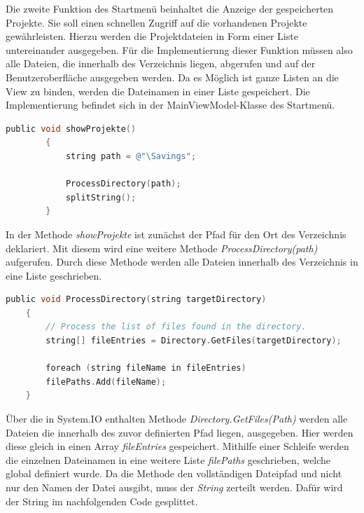 \linebreak
Die zweite Funktion des Startmenü beinhaltet die Anzeige der gespeicherten Projekte. Sie soll einen schnellen Zugriff auf die 
vorhandenen Projekte gewährleisten. Hierzu werden die Projektdateien in Form einer Liste untereinander ausgegeben. Für die 
Implementierung dieser Funktion müssen also alle Dateien, die innerhalb des Verzeichnis liegen, abgerufen und auf der 
Benutzeroberfläche ausgegeben werden. Da es Möglich ist ganze Listen an die View zu binden, werden die Dateinamen in einer Liste 
gespeichert. Die Implementierung befindet sich in der MainViewModel-Klasse des Startmenü. 
\\
\begin{lstlisting}[language=C,
    frame=single,           % Ein Rahmen um den Code
    framexleftmargin=15pt,  % Rahmen link von den Zahlen
    style=algoBericht,
    label={showProjekte},
    captionpos=b,           % Caption unter den Code setzen
    caption={showProjekte}]
        public void showProjekte()
        {
            string path = @"\Savings";
            
            ProcessDirectory(path);
            splitString();
        }
\end{lstlisting}
In der Methode \textit{showProjekte} ist zunächst der Pfad für den Ort des Verzeichnis deklariert. Mit diesem wird eine weitere 
Methode \textit{ProcessDirectory(path)} aufgerufen. Durch diese Methode werden alle Dateien innerhalb des Verzeichnis in eine Liste 
geschrieben. 
\\
\begin{lstlisting}[language=C,
    frame=single,           % Ein Rahmen um den Code
    framexleftmargin=15pt,  % Rahmen link von den Zahlen
    style=algoBericht,
    label={ProcessDirectory},
    captionpos=b,           % Caption unter den Code setzen
    caption={ProcessDirectory}]
    public void ProcessDirectory(string targetDirectory)
    {
        // Process the list of files found in the directory.
        string[] fileEntries = Directory.GetFiles(targetDirectory);

        foreach (string fileName in fileEntries)  
        filePaths.Add(fileName);                  
    }
\end{lstlisting}
Über die in System.IO enthalten Methode \textit{Directory.GetFiles(Path)} werden alle Dateien die innerhalb des zuvor definierten Pfad liegen, ausgegeben. Hier werden diese gleich in einen Array \textit{fileEntries} gespeichert. Mithilfe einer Schleife werden die einzelnen Dateinamen in eine weitere Liste \textit{filePaths} geschrieben, welche global definiert wurde. Da die Methode den vollständigen Dateipfad und nicht nur den Namen der Datei ausgibt, muss der \textit{String} zerteilt werden. Dafür wird der String im nachfolgenden Code gesplittet. 
